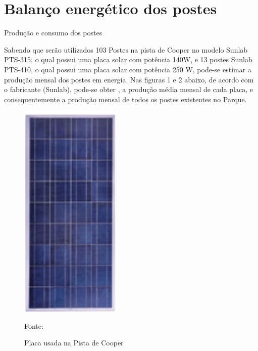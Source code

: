 \section{Balan\c{c}o energ\'etico dos postes}

	Produ\c{c}\~ao e consumo dos postes
	
	Sabendo que ser\~ao utilizados 103 Postes na pista de Cooper no modelo Sunlab PTS-315, o qual possui uma placa solar com pot\^encia 140W, e 13 postes  Sunlab PTS-410, o qual possui uma placa solar com pot\^encia 250 W, pode-se estimar a produ\c{c}\~ao mensal dos postes em energia. Nas figuras 1 e 2 abaixo, de acordo com o fabricante (Sunlab), pode-se obter , a produ\c{c}\~ao m\'edia mensal de cada placa, e consequentemente a produ\c{c}\~ao mensal de todos os postes existentes no Parque.
	
\begin{figure}[H]
	\centering
	\label{PlacaPistadeCooper}
		\includegraphics[keepaspectratio=true,scale=0.9]{figuras/PlacaPistadeCooper.png}
	\caption{Placa usada na Pista de Cooper}
	\small{Fonte: \cite{NEOSOLARCASASOLAR} }
\end{figure}

